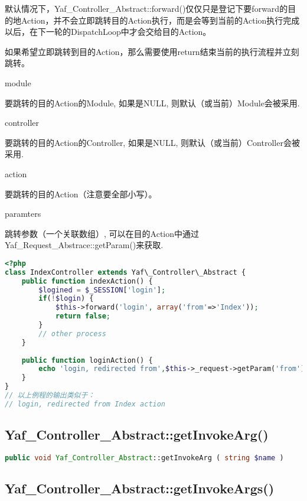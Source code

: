 默认情况下，Yaf\_Controller\_Abstract::forward()仅仅只是登记下要forward的目的地Action，并不会立即跳转目的Action执行，而是会等到当前的Action执行完成以后，在下一轮的DispatchLoop中才会交给目的Action。

如果希望立即跳转到目的Action，那么需要使用return结束当前的执行流程并立刻跳转。


\begin{compactitem}
\item module

要跳转的目的Action的Module, 如果是NULL, 则默认（或当前）Module会被采用.

\item controller

要跳转的目的Action的Controller, 如果是NULL, 则默认（或当前）Controller会被采用.

\item action

要跳转的目的Action（注意要全部小写）。

\item paramters

跳转参数（一个关联数组）, 可以在目的Action中通过Yaf\_Request\_Abstrace::getParam()来获取.

\end{compactitem}


\begin{lstlisting}[language=PHP]
<?php
class IndexController extends Yaf\_Controller\_Abstract {
    public function indexAction() {
        $logined = $_SESSION['login'];
        if(!$login) {
            $this->forward('login', array('from'=>'Index'));
            return false;
        }
        // other process
    }
    
    public function loginAction() {
        echo 'login, redirected from',$this->_request->getParam('from'), ' action';
    }
}
// 以上例程的输出类似于：
// login, redirected from Index action
\end{lstlisting}

\subsection{Yaf\_Controller\_Abstract::getInvokeArg()}


\begin{lstlisting}[language=PHP]
public void Yaf_Controller_Abstract::getInvokeArg ( string $name )
\end{lstlisting}




\subsection{Yaf\_Controller\_Abstract::getInvokeArgs()}



